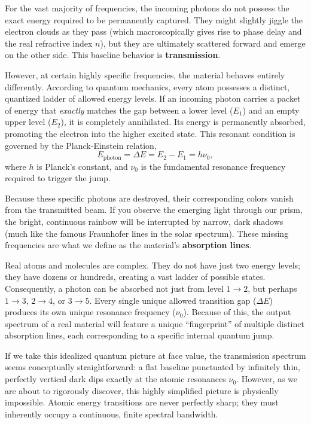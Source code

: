 For the vast majority of frequencies, the incoming photons do not possess the exact energy required to be permanently captured. They might slightly jiggle the electron clouds as they pass (which macroscopically gives rise to phase delay and the real refractive index $n$), but they are ultimately scattered forward and emerge on the other side. This baseline behavior is \textbf{transmission}.

However, at certain highly specific frequencies, the material behaves entirely differently. According to quantum mechanics, every atom possesses a distinct, quantized ladder of allowed energy levels. If an incoming photon carries a packet of energy that \emph{exactly} matches the gap between a lower level ($E_1$) and an empty upper level ($E_2$), it is completely annihilated. Its energy is permanently absorbed, promoting the electron into the higher excited state. This resonant condition is governed by the Planck-Einstein relation,
\begin{equation*}
    E_{\text{photon}} = \Delta E = E_2 - E_1 = h\nu_0,
\end{equation*}
where $h$ is Planck's constant, and $\nu_0$ is the fundamental resonance frequency required to trigger the jump.

Because these specific photons are destroyed, their corresponding colors vanish from the transmitted beam. If you observe the emerging light through our prism, the bright, continuous rainbow will be interrupted by narrow, dark shadows (much like the famous Fraunhofer lines in the solar spectrum). These missing frequencies are what we define as the material's \textbf{absorption lines}.

\begin{keyinsight}
    Real atoms and molecules are complex. They do not have just two energy levels; they have dozens or hundreds, creating a vast ladder of possible states. Consequently, a photon can be absorbed not just from level $1\to2$, but perhaps $1\to3$, $2\to4$, or $3\to5$. Every single unique allowed transition gap ($\Delta E$) produces its own unique resonance frequency ($\nu_0$). Because of this, the output spectrum of a real material will feature a unique ``fingerprint'' of multiple distinct absorption lines, each corresponding to a specific internal quantum jump.
\end{keyinsight}

If we take this idealized quantum picture at face value, the transmission spectrum seems conceptually straightforward: a flat baseline punctuated by infinitely thin, perfectly vertical dark dips exactly at the atomic resonances $\nu_0$. However, as we are about to rigorously discover, this highly simplified picture is physically impossible. Atomic energy transitions are never perfectly sharp; they must inherently occupy a continuous, finite spectral bandwidth.

